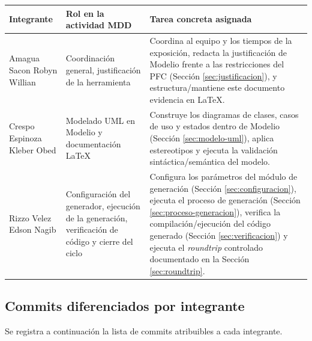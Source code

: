 \documentclass[11pt,a4paper]{article}
\begin{document}
\begin{center}
\begin{tabularx}{\linewidth}{p{3cm}XX}
\toprule
\textbf{Integrante} & \textbf{Rol en la actividad MDD} & \textbf{Tarea concreta
asignada} \\
\midrule
Amagua Sacon Robyn Willian & Coordinación general, justificación de la herramienta
& Coordina al equipo y los tiempos de la exposición, redacta
la justificación de Modelio frente a las restricciones del PFC (Sección
\ref{sec:justificacion}), y estructura/mantiene este documento evidencia en LaTeX. \\
Crespo Espinoza Kleber Obed & Modelado UML en Modelio y documentación LaTeX &
Construye los diagramas de clases, casos de uso y estados dentro de Modelio
(Sección \ref{sec:modelo-uml}), aplica estereotipos y ejecuta la validación
sintáctica/semántica del modelo. \\
Rizzo Velez Edson Nagib & Configuración del generador, ejecución de la generación,
verificación de código y cierre del ciclo & Configura los parámetros del módulo de
generación (Sección \ref{sec:configuracion}), ejecuta el proceso de generación
(Sección \ref{sec:proceso-generacion}), verifica la compilación/ejecución del
código generado (Sección \ref{sec:verificacion}) y ejecuta el \textit{roundtrip}
controlado documentado en la Sección \ref{sec:roundtrip}. \\
\bottomrule
\end{tabularx}
\end{center}

\subsection{Commits diferenciados por integrante}
Se registra a continuación la lista de commits atribuibles a cada integrante.
\end{document}

